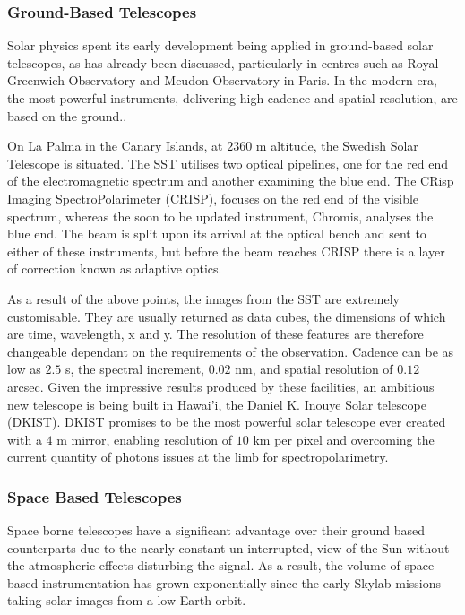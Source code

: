 \subsubsection{Ground-Based Telescopes}
\label{sec:ground}
Solar physics spent its early development being applied in ground-based solar telescopes, as has already been discussed, particularly in centres such as Royal Greenwich Observatory and Meudon Observatory in Paris.
In the modern era, the most powerful instruments, delivering high cadence and spatial resolution, are based on the ground..

On La Palma in the Canary Islands, at $2360$ m altitude, the Swedish Solar Telescope is situated.
The SST utilises two optical pipelines, one for the red end of the electromagnetic spectrum and another examining the blue end.
The CRisp Imaging SpectroPolarimeter (CRISP), focuses on the red end of the visible spectrum, whereas the soon to be updated instrument, Chromis, analyses the blue end.
The beam is split upon its arrival at the optical bench and sent to either of these instruments, but before the beam reaches CRISP there is a layer of correction known as adaptive optics.

As a result of the above points, the images from the SST are extremely customisable.
They are usually returned as data cubes, the dimensions of which are time, wavelength, x and y.
The resolution of these features are therefore changeable dependant on the requirements of the observation.
Cadence can be as low as $2.5$ s, the spectral increment, $0.02$ nm, and spatial resolution of $0.12$ arcsec.
Given the impressive results produced by these facilities, an ambitious new telescope is being built in Hawai'i, the Daniel K. Inouye Solar telescope (DKIST).
DKIST promises to be the most powerful solar telescope ever created with a $4$ m mirror, enabling resolution of $10$ km per pixel and overcoming the current quantity of photons issues at the limb for spectropolarimetry.



\subsubsection{Space Based Telescopes}

Space borne telescopes have a significant advantage over their ground based counterparts due to the nearly constant un-interrupted, view of the Sun without the atmospheric effects disturbing the signal.
As a result, the volume of space based instrumentation has grown exponentially since the early Skylab missions taking solar images from a low Earth orbit.

